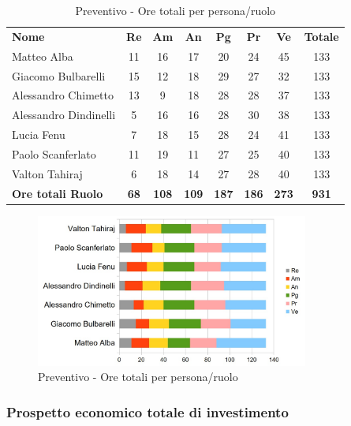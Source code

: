 		\begin{table} [h!]
			\begin{center}
				\begin{tabular} { m{3.5cm} c c c c c c c }
					\rowcolor{lightgray}
					\textbf{Nome} & \textbf{Re} & \textbf{Am} & \textbf{An} & \textbf{Pg} & \textbf{Pr} & \textbf{Ve} & \textbf{Totale} \\
					Matteo Alba & 11 & 16 & 17 & 20 & 24 & 45 & 133 \\
					Giacomo Bulbarelli & 15 & 12 & 18 & 29 & 27 & 32 & 133 \\
					Alessandro Chimetto & 13 & 9 & 18 & 28 & 28 & 37 & 133 \\
					Alessandro Dindinelli & 5 & 16 & 16 & 28 & 30 & 38 & 133 \\
					Lucia Fenu & 7 & 18 & 15 & 28 & 24 & 41 & 133 \\
					Paolo Scanferlato & 11 & 19 & 11 & 27 & 25 & 40 & 133 \\
					Valton Tahiraj & 6 & 18 & 14 & 27 & 28 & 40 & 133 \\
					\textbf{Ore totali Ruolo} & \textbf{68} & \textbf{108} & \textbf{109} & \textbf{187} & \textbf{186}& \textbf{273} & \textbf{931}
				\end{tabular}
				\caption{Preventivo - Ore totali per persona/ruolo}
			\end{center}
		\end{table}
	
		\begin{figure} [h!]
			\centering
			\includegraphics[width=0.8\textwidth]{res/img/grafici/OreTotaliInvestimento.jpg}
			\caption{Preventivo - Ore totali per persona/ruolo} 
		\end{figure}
	
	\newpage
	
	\subsubsection{Prospetto economico totale di investimento}
	
